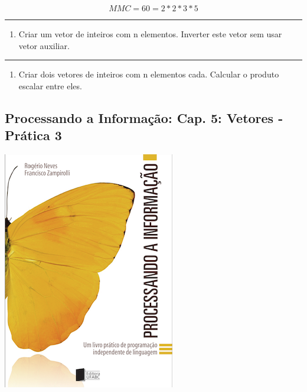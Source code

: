 \documentclass[12pt,a4paper]{article}
\renewcommand{\linethickness}{0.05em}
\providecommand{\tightlist}{%
      \setlength{\itemsep}{0pt}\setlength{\parskip}{0pt}}
\begin{document}
\[MMC = 60 = 2*2*3*5\]

    \begin{center}\rule{0.5\linewidth}{\linethickness}\end{center}

\begin{enumerate}
\def\labelenumi{\arabic{enumi}.}
\setcounter{enumi}{3}
\tightlist
\item
  Criar um vetor de inteiros com n elementos. Inverter este vetor sem
  usar vetor auxiliar.
\end{enumerate}

    \begin{center}\rule{0.5\linewidth}{\linethickness}\end{center}

\begin{enumerate}
\def\labelenumi{\arabic{enumi}.}
\setcounter{enumi}{4}
\tightlist
\item
  Criar dois vetores de inteiros com n elementos cada. Calcular o
  produto escalar entre eles.
\end{enumerate}

    \hypertarget{processando-a-informauxe7uxe3o-cap.-5-vetores---pruxe1tica-3}{%
\subsection{Processando a Informação: Cap. 5: Vetores - Prática
3}\label{processando-a-informauxe7uxe3o-cap.-5-vetores---pruxe1tica-3}}

    \includegraphics{"figs/Capa_Processando_Informacao.jpg"}
\end{document}
